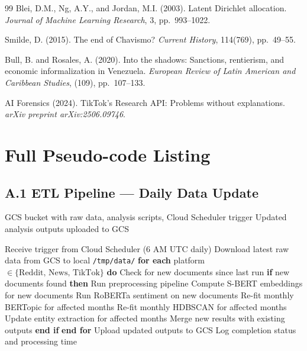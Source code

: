 \documentclass[12pt, letterpaper]{article}
\newenvironment{pseudoblock}[1]{%
  \begin{mdframed}[
    backgroundcolor=pseudobg,
    linecolor=pseudoframe,
    linewidth=1.5pt,
    frametitle={\color{pseudoframe}\bfseries\small Pseudo-code: #1},
    frametitlebackgroundcolor=pseudoframe!15
  ]
  \begin{algorithmic}[1]
}{%
  \end{algorithmic}
  \end{mdframed}
}
\begin{document}
\begin{thebibliography}{99}
Blei, D.M., Ng, A.Y., and Jordan, M.I. (2003).
Latent Dirichlet allocation.
\textit{Journal of Machine Learning Research}, 3, pp.\ 993--1022.

Smilde, D. (2015).
The end of Chavismo?
\textit{Current History}, 114(769), pp.\ 49--55.

Bull, B. and Rosales, A. (2020).
Into the shadows: Sanctions, rentierism, and economic informalization in Venezuela.
\textit{European Review of Latin American and Caribbean Studies}, (109), pp.\ 107--133.

AI Forensics (2024).
TikTok's Research API: Problems without explanations.
\textit{arXiv preprint arXiv:2506.09746}.

\end{thebibliography}

\newpage
\appendix
\renewcommand{\thesection}{Appendix \Alph{section}}

\section{Full Pseudo-code Listing}
\label{app:pseudocode}

\subsection*{A.1 \quad ETL Pipeline --- Daily Data Update}

\begin{pseudoblock}{Daily ETL Pipeline (Cloud Run Jobs)}
\REQUIRE GCS bucket with raw data, analysis scripts, Cloud Scheduler trigger
\ENSURE Updated analysis outputs uploaded to GCS

\STATE Receive trigger from Cloud Scheduler (6 AM UTC daily)
\STATE Download latest raw data from GCS to local \texttt{/tmp/data/}
\STATE \textbf{for each} platform $\in \{\text{Reddit, News, TikTok}\}$ \textbf{do}
\STATE \quad Check for new documents since last run
\STATE \quad \textbf{if} new documents found \textbf{then}
\STATE \quad \quad Run preprocessing pipeline
\STATE \quad \quad Compute S-BERT embeddings for new documents
\STATE \quad \quad Run RoBERTa sentiment on new documents
\STATE \quad \quad Re-fit monthly BERTopic for affected months
\STATE \quad \quad Re-fit monthly HDBSCAN for affected months
\STATE \quad \quad Update entity extraction for affected months
\STATE \quad \quad Merge new results with existing outputs
\STATE \quad \textbf{end if}
\STATE \textbf{end for}
\STATE Upload updated outputs to GCS
\STATE Log completion status and processing time
\end{pseudoblock}
\end{document}
